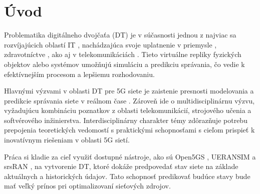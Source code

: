 \chapter{Úvod}
\par{
Problematika digitálneho dvojčaťa (DT) je v súčasnosti jednou z najviac sa rozvíjajúcich oblastí IT \cite{DimensionOfDTAplication}, nachádzajúca svoje uplatnenie v priemysle \cite{manufacturing}, zdravotníctve \cite{siemens_helthcare}, ako aj v telekomunikáciách \cite{AplicationsOfDT}. Tieto virtuálne repliky fyzických objektov alebo systémov umožňujú simuláciu a predikciu správania, čo vedie k efektívnejším procesom a lepšiemu rozhodovaniu.
}

\par{
Hlavnými výzvami v oblasti DT pre 5G siete je zaistenie presnosti modelovania a predikcie správania siete v reálnom čase \cite{challenges_human_factor}. Zároveň ide o multidisciplinárnu výzvu, vyžadujúcu kombináciu poznatkov z oblasti telekomunikácií, strojového učenia a softvérového inžinierstva. Interdisciplinárny charakter témy zdôrazňuje potrebu prepojenia teoretických vedomostí s praktickými schopnosťami s cieľom prispieť k inovatívnym riešeniam v oblasti 5G sietí.
}
\par{
Práca si kladie za cieľ využiť dostupné nástroje, ako sú Open5GS \cite{open5gs}, UERANSIM \cite{ueransim} a srsRAN \cite{srsran}, na vytvorenie DT, ktoré dokáže predpovedať stav siete na základe aktuálnych a historických údajov. Tato schopnosť predikovať budúce stavy bude mať veľký prínos pri optimalizovaní sieťových zdrojov.
}